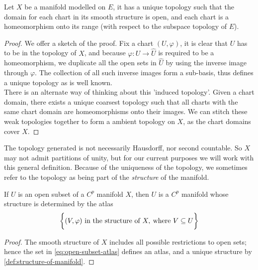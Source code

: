\documentclass[../main-v2-manifolds.tex]{subfiles}
\begin{document}
\begin{wts}\label{def:topology-unique-on-manifold}
    Let $X$ be a manifold modelled on $E$, it has a unique topology such that the domain for each chart in its smooth structure is open, and each chart is a homeomorphism onto its range (with respect to the subspace topology of $E$).
\end{wts}
\begin{proof}
    We offer a sketch of the proof. Fix a chart $(U,\varphi)$, it is clear that $U$ has to be in the topology of $X$, and because $\varphi: U\to \hat{U}$ is required to be a homeomorphism, we duplicate all the open sets in $\hat{U}$ by using the inverse image through $\varphi$. The collection of all such inverse images form a sub-basis, thus defines a unique topology as is well known.\\

    There is an alternate way of thinking about this 'induced topology'. Given a chart domain, there exists a unique coarsest topology such that all charts with the same chart domain are homeomorphisms onto their images. We can stitch these weak topologies together to form a ambient topology on $X$, as the chart domains cover $X$.
\end{proof}
\begin{remark}
    The topology generated is not necessarily Hausdorff, nor second countable. So $X$ may not admit partitions of unity, but for our current purposes we will work with this general definition. Because of the uniqueness of the topology, we sometimes refer to the topology as being part of the \emph{structure} of the manifold.
\end{remark}
\begin{wts}\label{prop:open-subsets-of-manifolds}
    If $U$ is an open subset of a $C^p$ manifold $X$, then $U$ is a $C^p$ manifold whose structure is determined by the atlas
    \begin{equation}\label{eq:open-subset-atlas}
    \biggl\{{(V,\varphi) \text{ in the structure of }X,\:\text{where } V\subseteq U}\biggr\}
    \end{equation}
\end{wts}
\begin{proof}
    The smooth structure of $X$ includes all possible restrictions to open sets; hence the set in \cref{eq:open-subset-atlas} defines an atlas, and a unique structure by \cref{def:structure-of-manifold}.
\end{proof}
\end{document}
